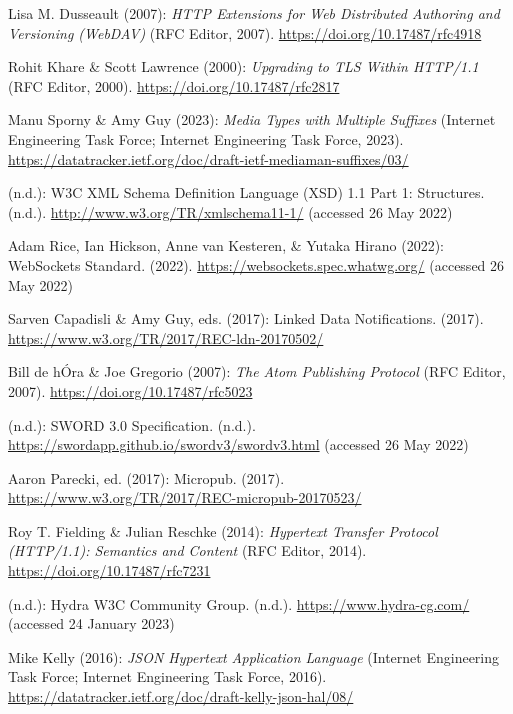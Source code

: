 \begin{thebibliography}{9}
Lisa M. Dusseault (2007): \emph{{HTTP Extensions} for {Web Distributed
Authoring} and {Versioning} ({WebDAV})} ({RFC Editor}, 2007).
\url{https://doi.org/10.17487/rfc4918}

Rohit Khare \& Scott Lawrence (2000): \emph{Upgrading to {TLS Within
HTTP}/1.1} ({RFC Editor}, 2000).
\url{https://doi.org/10.17487/rfc2817}

Manu Sporny \& Amy Guy (2023): \emph{{Media Types with Multiple
Suffixes}} (Internet Engineering Task Force; Internet Engineering Task
Force, 2023).
\url{https://datatracker.ietf.org/doc/draft-ietf-mediaman-suffixes/03/}

(n.d.): {W3C XML Schema Definition Language} ({XSD}) 1.1 {Part} 1:
{Structures}. (n.d.). \url{http://www.w3.org/TR/xmlschema11-1/}
(accessed 26 May 2022)

Adam Rice, Ian Hickson, Anne van Kesteren, \& Yutaka Hirano (2022):
{WebSockets Standard}. (2022). \url{https://websockets.spec.whatwg.org/}
(accessed 26 May 2022)

Sarven Capadisli \& Amy Guy, eds. (2017): Linked {Data Notifications}.
(2017). \url{https://www.w3.org/TR/2017/REC-ldn-20170502/}

Bill de hÓra \& Joe Gregorio (2007): \emph{The {Atom Publishing
Protocol}} ({RFC Editor}, 2007).
\url{https://doi.org/10.17487/rfc5023}

(n.d.): {SWORD} 3.0 {Specification}. (n.d.).
\url{https://swordapp.github.io/swordv3/swordv3.html} (accessed 26 May
2022)

Aaron Parecki, ed. (2017): Micropub. (2017).
\url{https://www.w3.org/TR/2017/REC-micropub-20170523/}

Roy T. Fielding \& Julian Reschke (2014): \emph{Hypertext {Transfer
Protocol} ({HTTP}/1.1): {Semantics} and {Content}} ({RFC Editor}, 2014).
\url{https://doi.org/10.17487/rfc7231}

(n.d.): Hydra {W3C Community Group}. (n.d.).
\url{https://www.hydra-cg.com/} (accessed 24 January 2023)

Mike Kelly (2016): \emph{{JSON Hypertext Application Language}}
(Internet Engineering Task Force; Internet Engineering Task Force,
2016). \url{https://datatracker.ietf.org/doc/draft-kelly-json-hal/08/}


\end{thebibliography}
